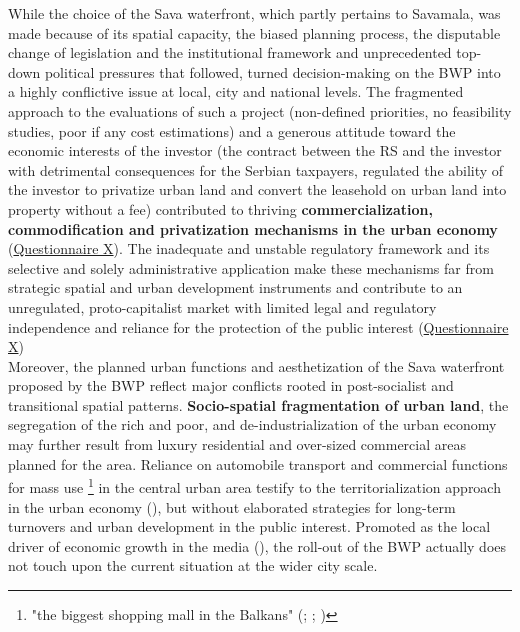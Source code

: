 \documentclass[11pt]{report}
\begin{document}
{{{{While the choice of the Sava waterfront, which partly pertains to Savamala, was made because of its spatial capacity, the biased planning process, the disputable change of legislation and the institutional framework and unprecedented top-down political pressures that followed, turned decision-making on the BWP into a highly conflictive issue at local, city and national levels. The fragmented approach to the evaluations of such a project (non-defined priorities, no feasibility studies, poor if any cost estimations) and a generous attitude toward the economic interests of the investor (the contract between the RS and the investor with detrimental consequences for the Serbian taxpayers, regulated the ability of the investor to privatize urban land and convert the leasehold on urban land into property without a fee) contributed to thriving  \textbf{commercialization, commodification and privatization mechanisms in the urban economy}
(\href{Questionnaire Experts Savamala}{Questionnaire X}).
The inadequate and unstable regulatory framework and its selective and solely administrative application make these mechanisms far from strategic spatial and urban development instruments and contribute to an unregulated, proto-capitalist market with limited legal and regulatory independence and reliance for the protection of the public interest 
(\href{Questionnaire Experts Savamala}{Questionnaire X})
\\

Moreover, the planned urban functions and aesthetization of the Sava waterfront proposed by the BWP reflect major conflicts rooted in post-socialist and transitional spatial patterns.
\textbf{Socio-spatial fragmentation of urban land}, the segregation of the rich and poor, and de-industrialization of the urban economy may further result from luxury residential and over-sized commercial areas planned for the area.
Reliance on automobile transport and commercial functions for mass use
\footnote{"the biggest shopping mall in the Balkans" (\href{ref}{\citealt{ekapija_beogradska_2014}}; \href{ref}{\citealt{mucibabic_soping_2016}}; \href{ref}{\citealt{n1_beograd_2016}})}
in the central urban area testify to the territorialization approach in the urban economy (\href{Hirt}{\citealt{hirt_belgrade_2009}}), but without elaborated strategies for long-term turnovers and urban development in the public interest. Promoted as the local driver of economic growth in the media (\href{Novosti}{\citealt{novosti_vucic_2016}}), the roll-out of the BWP actually does not touch upon the current situation at the wider city scale.
\\

}}}}
\end{document}
